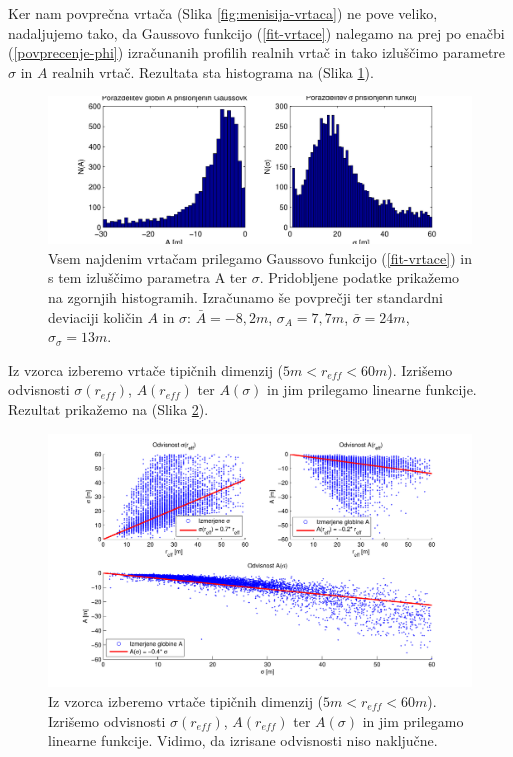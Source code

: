 \documentclass[a4paper, twoside, 12pt]{book}
\begin{document}
Ker nam povprečna vrtača (Slika \ref{fig:menisija-vrtaca}) ne pove veliko, nadaljujemo tako, da Gaussovo funkcijo (\ref{fit-vrtace}) nalegamo na prej po enačbi (\ref{povprecenje-phi}) izračunanih profilih realnih vrtač in tako izluščimo parametre $\sigma$ in $A$ realnih vrtač.
Rezultata sta histograma na (Slika \ref{fig:menisija-globine-sigme-hist}).

  \begin{figure}[h!]
    \begin{center}
      \includegraphics[width=14cm]{slike/menisija-visine-in-sigme-hist}
    \end{center}
    \caption{Vsem najdenim vrtačam prilegamo Gaussovo funkcijo (\ref{fit-vrtace}) in s tem izluščimo parametra A ter $\sigma$. Pridobljene podatke prikažemo na zgornjih histogramih. Izračunamo še povprečji ter standardni deviaciji količin $A$ in $\sigma$: $\bar A= -8,2m$, $\sigma_A=7,7m$, $\bar \sigma=24m$, $\sigma_{\sigma}=13m$.}
    \label{fig:menisija-globine-sigme-hist}
  \end{figure}

Iz vzorca izberemo vrtače tipičnih dimenzij ($5m < r_{eff} < 60m$). Izrišemo odvisnosti $\sigma (r_{eff})$, $A (r_{eff})$ ter $A(\sigma)$ in jim prilegamo linearne funkcije. Rezultat prikažemo na (Slika \ref{fig:menisija-sigma}).

  \begin{figure}[h!]
    \begin{center}
      \includegraphics[width=14cm]{slike/menisija-A-sigma-reff}
    \end{center}
    \caption{Iz vzorca izberemo vrtače tipičnih dimenzij ($5m < r_{eff} < 60m$). Izrišemo odvisnosti $\sigma (r_{eff})$, $A (r_{eff})$ ter $A(\sigma)$ in jim prilegamo linearne funkcije. Vidimo, da izrisane odvisnosti niso naključne.}
    \label{fig:menisija-sigma}
  \end{figure}
\end{document}
